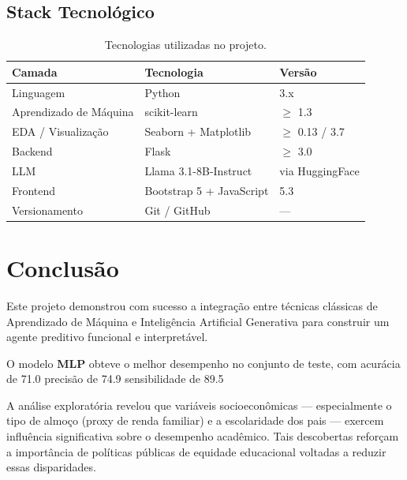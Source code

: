 \documentclass[12pt, a4paper]{article}
\begin{document}
\subsection{Stack Tecnológico}

\begin{table}[H]
  \centering
  \caption{Tecnologias utilizadas no projeto.}
  \label{tab:tech}
  \begin{tabular}{lll}
    \toprule
    \textbf{Camada}          & \textbf{Tecnologia}           & \textbf{Versão} \\
    \midrule
    Linguagem                & Python                        & 3.x \\
    Aprendizado de Máquina   & scikit-learn                  & $\geq$ 1.3 \\
    EDA / Visualização       & Seaborn + Matplotlib          & $\geq$ 0.13 / 3.7 \\
    Backend                  & Flask                         & $\geq$ 3.0 \\
    LLM                      & Llama 3.1-8B-Instruct         & via HuggingFace \\
    Frontend                 & Bootstrap 5 + JavaScript      & 5.3 \\
    Versionamento            & Git / GitHub                  & --- \\
    \bottomrule
  \end{tabular}
\end{table}

\section{Conclusão}

Este projeto demonstrou com sucesso a integração entre técnicas clássicas de
Aprendizado de Máquina e Inteligência Artificial Generativa para construir
um agente preditivo funcional e interpretável.

O modelo \textbf{MLP} obteve o melhor desempenho no
conjunto de teste, com acurácia de
71.0%
precisão de 74.9%
sensibilidade de 89.5%

A análise exploratória revelou que variáveis socioeconômicas --- especialmente
o tipo de almoço (proxy de renda familiar) e a escolaridade dos pais ---
exercem influência significativa sobre o desempenho acadêmico. Tais
descobertas reforçam a importância de políticas públicas de equidade
educacional voltadas a reduzir essas disparidades.
\end{document}
